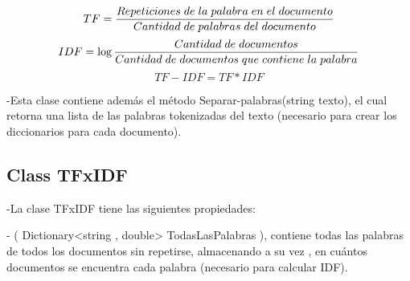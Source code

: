 \documentclass[a4paper,12pt]{article}
\begin{document}
    \begin{equation}\label{eq:TF}
        TF = \frac{Repeticiones\hspace{0.1cm}de\hspace{0.1cm} la\hspace{0.1cm} palabra\hspace{0.1cm} en\hspace{0.1cm} el\hspace{0.1cm} documento}{Cantidad\hspace{0.1cm} de\hspace{0.1cm} palabras\hspace{0.1cm} del\hspace{0.1cm} documento}
    \end{equation}
    \vspace{1cm}
    \begin{equation}
        IDF = \log{\frac{Cantidad \hspace{0.1cm}de\hspace{0.1cm} documentos}{Cantidad \hspace{0.1cm}de \hspace{0.1cm}documentos\hspace{0.1cm} que\hspace{0.1cm} contiene \hspace{0.1cm}la \hspace{0.1cm}palabra}}
    \end{equation}
    \vspace{1cm}
    \begin{equation}\label{eq:TF*IDF}
        TF-IDF = TF*IDF
    \end{equation}

    \vspace{1cm}

    -Esta clase contiene además el método Separar-palabras(string texto), 
    el cual retorna una lista de las palabras tokenizadas del texto
    (necesario para crear los diccionarios para cada documento).
    
    \newpage

    \subsection{Class TFxIDF}\label{sub:TFxIDF}

    -La clase TFxIDF tiene las siguientes propiedades:
    \vspace{1cm}

    - ( Dictionary<string , double> TodasLasPalabras ), 
    contiene todas las palabras de todos los documentos sin repetirse, almacenando a su vez , en cuántos documentos se encuentra cada palabra (necesario para calcular IDF).
\end{document}
